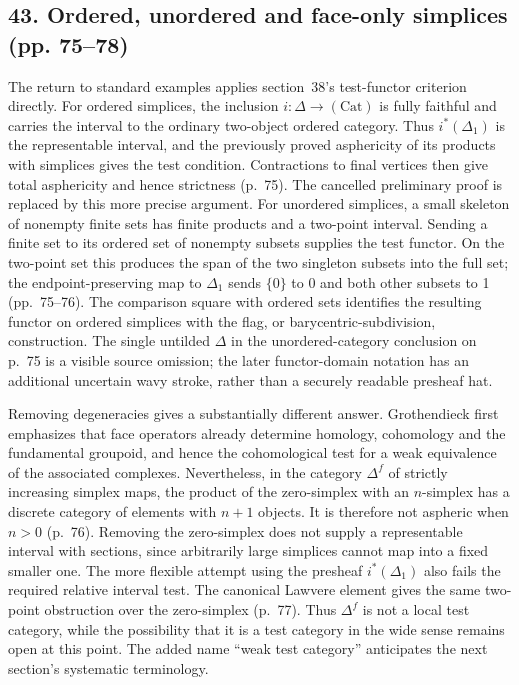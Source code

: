 \subsection*{43. Ordered, unordered and face-only simplices (pp. 75--78)}
The return to standard examples applies section~38's test-functor criterion directly. For ordered simplices, the inclusion $i:\Delta\to(\mathrm{Cat})$ is fully faithful and carries the interval to the ordinary two-object ordered category. Thus $i^*(\Delta_1)$ is the representable interval, and the previously proved asphericity of its products with simplices gives the test condition. Contractions to final vertices then give total asphericity and hence strictness (p.~75). The cancelled preliminary proof is replaced by this more precise argument. For unordered simplices, a small skeleton of nonempty finite sets has finite products and a two-point interval. Sending a finite set to its ordered set of nonempty subsets supplies the test functor. On the two-point set this produces the span of the two singleton subsets into the full set; the endpoint-preserving map to $\Delta_1$ sends $\{0\}$ to 0 and both other subsets to 1 (pp.~75--76). The comparison square with ordered sets identifies the resulting functor on ordered simplices with the flag, or barycentric-subdivision, construction. The single untilded $\Delta$ in the unordered-category conclusion on p.~75 is a visible source omission; the later functor-domain notation has an additional uncertain wavy stroke, rather than a securely readable presheaf hat.

Removing degeneracies gives a substantially different answer. Grothendieck first emphasizes that face operators already determine homology, cohomology and the fundamental groupoid, and hence the cohomological test for a weak equivalence of the associated complexes. Nevertheless, in the category $\Delta^f$ of strictly increasing simplex maps, the product of the zero-simplex with an $n$-simplex has a discrete category of elements with $n+1$ objects. It is therefore not aspheric when $n>0$ (p.~76). Removing the zero-simplex does not supply a representable interval with sections, since arbitrarily large simplices cannot map into a fixed smaller one. The more flexible attempt using the presheaf $i^*(\Delta_1)$ also fails the required relative interval test. The canonical Lawvere element gives the same two-point obstruction over the zero-simplex (p.~77). Thus $\Delta^f$ is not a local test category, while the possibility that it is a test category in the wide sense remains open at this point. The added name ``weak test category'' anticipates the next section's systematic terminology.

